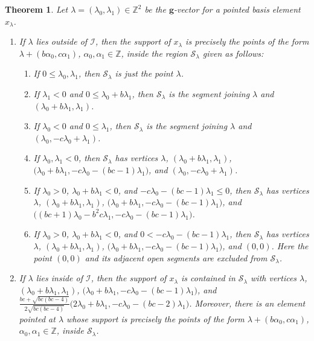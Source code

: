 \documentclass{amsart}
\newtheorem{theorem}{Theorem}
\numberwithin{theorem}{section}
\newcommand{\bfg}{\boldsymbol{g}}
\newcommand{\cI}{\mathcal{I}}
\newcommand{\cS}{\mathcal{S}}
\newcommand{\ZZ}{\mathbb{Z}}
\begin{document}
  \begin{theorem}
    \label{th:maximum support}
    Let $\lambda=(\lambda_0,\lambda_1)\in\ZZ^2$ be the $\bfg$-vector for a pointed basis element $x_\lambda$.
    \begin{enumerate}
      \item If $\lambda$ lies outside of $\cI$, then the support of $x_\lambda$ is precisely the points of the form $\lambda+(b \alpha_0 ,c \alpha_1)$, $\alpha_0,\alpha_1\in\ZZ$, inside the region $\cS_\lambda$ given as follows:
        \begin{enumerate}
          \item If $0\le\lambda_0,\lambda_1$, then $\cS_\lambda$ is just the point $\lambda$.
          \item If $\lambda_1 < 0$ and $0\le\lambda_0+b\lambda_1$, then $\cS_\lambda$ is the segment joining $\lambda$ and $(\lambda_0+b\lambda_1,\lambda_1)$.
          \item If $\lambda_0 < 0$ and $0\le\lambda_1$, then $\cS_\lambda$ is the segment joining $\lambda$ and $(\lambda_0,-c\lambda_0+\lambda_1)$.
          \item If $\lambda_0,\lambda_1 < 0$, then $\cS_\lambda$ has  vertices $\lambda$, $(\lambda_0+b\lambda_1,\lambda_1)$, $\big(\lambda_0+b\lambda_1,-c\lambda_0-(bc-1)\lambda_1\big)$, and ${(\lambda_0,-c\lambda_0+\lambda_1)}$.
          \item If $\lambda_0 > 0$, $\lambda_0+b\lambda_1 < 0$, and $-c\lambda_0-(bc-1)\lambda_1\le 0$, then $\cS_\lambda$ has  vertices $\lambda$, $(\lambda_0+b\lambda_1,\lambda_1)$, $\big(\lambda_0+b\lambda_1,-c\lambda_0-(bc-1)\lambda_1\big)$, and $\big((bc+1)\lambda_0-b^2c\lambda_1,-c\lambda_0-(bc-1)\lambda_1\big)$.
          \item If $\lambda_0 > 0$, $\lambda_0+b\lambda_1 < 0$, and $0 < -c\lambda_0-(bc-1)\lambda_1$, then $\cS_\lambda$ has  vertices $\lambda$, $(\lambda_0+b\lambda_1,\lambda_1)$, $\big(\lambda_0+b\lambda_1,-c\lambda_0-(bc-1)\lambda_1\big)$, and $(0,0)$.  Here the point $(0,0)$ and its adjacent open segments are excluded from $\cS_\lambda$.
        \end{enumerate}
      \item If $\lambda$ lies inside of $\cI$, then the support of $x_\lambda$ is contained in $\cS_\lambda$ with  vertices $\lambda$, $(\lambda_0+b\lambda_1,\lambda_1)$, $\big(\lambda_0+b\lambda_1,-c\lambda_0-(bc-1)\lambda_1\big)$, and $\frac{bc+\sqrt{bc(bc-4)}}{2\sqrt{bc(bc-4)}}\big(2\lambda_0+b\lambda_1,-c\lambda_0-(bc-2)\lambda_1\big)$.
        Moreover, there is an element pointed at $\lambda$ whose support is precisely the points of the form $\lambda+(b \alpha_0 ,c \alpha_1)$, $\alpha_0,\alpha_1\in\ZZ$, inside $\cS_\lambda$.
    \end{enumerate}
  \end{theorem}
\end{document}
